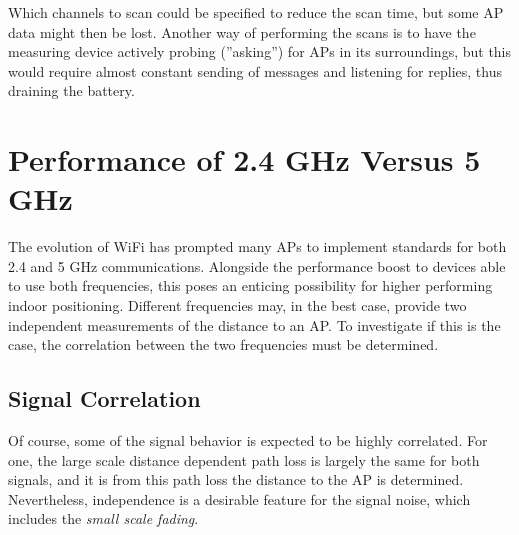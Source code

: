 \documentclass{LTHthesis}
\begin{document}
Which channels to scan could be specified to reduce the scan time, but some AP data might then be lost. Another way of performing the scans is to have the measuring device actively probing (''asking'') for APs in its surroundings, but this would require almost constant sending of messages and listening for replies, thus draining the battery.               
%
\section{Performance of 2.4 GHz Versus 5 GHz}
%
The evolution of WiFi has prompted many APs to implement standards for both 2.4 and 5 GHz communications. Alongside the performance boost to devices able to use both frequencies, this poses an enticing possibility for higher performing indoor positioning. Different frequencies may, in the best case, provide two independent measurements of the distance to an AP. To investigate if this is the case, the correlation between the two frequencies must be determined.  
%
\subsection{Signal Correlation}
%
Of course, some of the signal behavior is expected to be highly correlated. For one, the large scale distance dependent path loss is largely the same for both signals, and it is from this path loss the distance to the AP is determined. Nevertheless, independence is a desirable feature for the signal noise, which includes the \emph{small scale fading}. 
\end{document}
